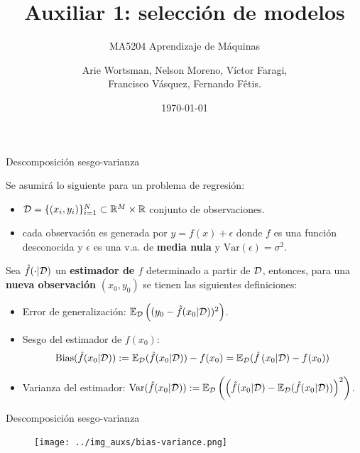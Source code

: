 \documentclass[handout, 9pt]{beamer}
\title{Auxiliar 1: selección de modelos}
\subtitle{MA5204 Aprendizaje de Máquinas}
\date{\today}
\author{Arie Wortsman, Nelson Moreno, Víctor Faragi,\\ Francisco Vásquez, Fernando Fêtis.}
\institute{Departamento de ingeniería matemática\\Universidad de Chile}
\begin{document}
\begin{frame}
  \titlepage
\end{frame}



\begin{frame}{Descomposición sesgo-varianza}

Se asumirá lo siguiente para un problema de regresión:

\begin{itemize}
	\item ${\mathcal D}=\{(x_i,y_i)\}_{i=1}^N\subset\mathbb{R} ^M\times\mathbb{R}$ conjunto de observaciones.
	\item cada observación es generada por $y=f(x)+\epsilon$ donde $f$ es una función desconocida y $\epsilon$ es una v.a. de \textbf{media nula} y $\text{Var}(\epsilon)=\sigma^2$.
\end{itemize}

	
\begin{definition}
	Sea $\hat{f}(\cdot|{\mathcal D})$ un \textbf{estimador de $f$} determinado a partir de ${\mathcal D}$, entonces, para una \textbf{nueva observación} $(x_0,y_0)$ se tienen las siguientes definiciones:
	
	\begin{itemize}
		\item Error de generalización: $\operatorname{\mathbb{E}}_{\mathcal D}\left((y_0-\hat{f}(x_0|{\mathcal D}))^2\right)$.
		\item Sesgo del estimador de $f(x_0)$:
		\begin{equation*}
			\text{Bias}(\hat{f}(x_0|{\mathcal D})):= \operatorname{\mathbb{E}}_{\mathcal D}(\hat{f}(x_0|{\mathcal D})) - f(x_0) = \operatorname{\mathbb{E}}_{\mathcal D}(\hat{f}\left(x_0|{\mathcal D}) - f(x_0)\right)
		\end{equation*}
		\item Varianza del estimador: $\text{Var}(\hat{f}(x_0|{\mathcal D})) := \operatorname{\mathbb{E}}_{\mathcal D}\left(\left(\hat{f}(x_0|{\mathcal D})-\operatorname{\mathbb{E}}_{\mathcal D}(\hat{f}(x_0|{\mathcal D}))\right)^2\right)$.
	\end{itemize}
\end{definition}

\end{frame}

\begin{frame}{Descomposición sesgo-varianza}

\begin{figure}
\centering
	\texttt{[image: ../img\_auxs/bias-variance.png]}
\end{figure}

\end{frame}
\end{document}
